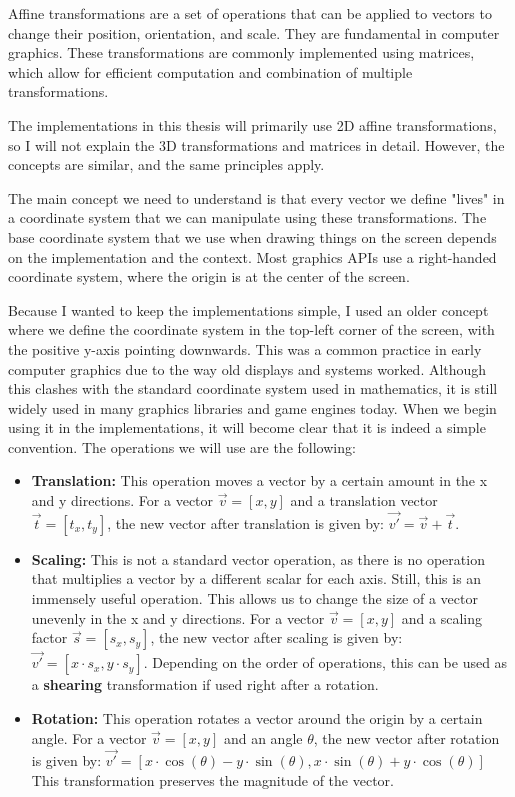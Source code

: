 Affine transformations are a set of operations that can be applied to vectors to change their position, orientation, and scale. They are fundamental in computer graphics. These transformations are commonly implemented using matrices, which allow for efficient computation and combination of multiple transformations.

The implementations in this thesis will primarily use 2D affine transformations, so I will not explain the 3D transformations and matrices in detail. However, the concepts are similar, and the same principles apply.

The main concept we need to understand is that every vector we define "lives" in a coordinate system that we can manipulate using these transformations. The base coordinate system that we use when drawing things on the screen depends on the implementation and the context. Most graphics APIs use a right-handed coordinate system, where the origin is at the center of the screen.

Because I wanted to keep the implementations simple, I used an older concept where we define the coordinate system in the top-left corner of the screen, with the positive y-axis pointing downwards. This was a common practice in early computer graphics due to the way old displays and systems worked. Although this clashes with the standard coordinate system used in mathematics, it is still widely used in many graphics libraries and game engines today. When we begin using it in the implementations, it will become clear that it is indeed a simple convention. The operations we will use are the following:

\begin{itemize}
    \item \textbf{Translation:} This operation moves a vector by a certain amount in the x and y directions. For a vector \(\vec{v} = [x, y]\) and a translation vector \(\vec{t} = [t_x, t_y]\), the new vector after translation is given by: \(\vec{v'} = \vec{v} + \vec{t}\).

    \pagebreak

    \item \textbf{Scaling:} This is not a standard vector operation, as there is no operation that multiplies a vector by a different scalar for each axis. Still, this is an immensely useful operation. This allows us to change the size of a vector unevenly in the x and y directions. For a vector \(\vec{v} = [x, y]\) and a scaling factor \(\vec{s} = [s_x, s_y]\), the new vector after scaling is given by: \(\vec{v'} = [x \cdot s_x, y \cdot s_y]\). Depending on the order of operations, this can be used as a \textbf{shearing} transformation if used right after a rotation.

    \item \textbf{Rotation:} This operation rotates a vector around the origin by a certain angle. For a vector \(\vec{v} = [x, y]\) and an angle \(\theta\), the new vector after rotation is given by: \linebreak \(\vec{v'} = [x \cdot \cos(\theta) - y \cdot \sin(\theta), x \cdot \sin(\theta) + y \cdot \cos(\theta)]\) This transformation preserves the magnitude of the vector.
\end{itemize}

